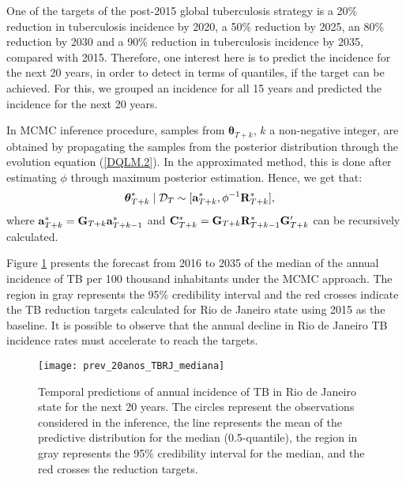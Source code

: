 \documentclass[12pt,a4paper]{article}\usepackage[]{graphicx}\usepackage[]{color}\usepackage{subfigure}
\newcommand{\bftheta}{\boldsymbol{\theta}}
\newcommand{\mathD}{\mathcal{D}}
\begin{document}
One of the targets of the post-2015 global tuberculosis strategy is a 20\% reduction in tuberculosis incidence by 2020, a 50\% reduction by 2025, an 80\% reduction by 2030 and a 90\% reduction in tuberculosis incidence by 2035, compared with 2015. 
Therefore, one interest here is to predict the incidence for the next 20 years, in order to detect in terms of quantiles, if the target can be achieved. 
For this, we grouped an incidence for all 15 years and predicted the incidence for the next 20 years.

In MCMC inference procedure, samples from ${\bftheta}_{T+k}$, $k$ a non-negative integer, are obtained by propagating the samples from the posterior distribution through the evolution equation (\ref{DQLM.2}). In the approximated method, this is done after estimating $\phi$ through maximum posterior estimation.
Hence, we get that:
\begin{align}\label{post_thet_condU_ksteps}
 \bftheta_{T+k}^*\mid \mathD_{T} &\sim [{\bf a}^*_{T+k},\phi^{-1}{\bf R}^*_{T+k}],
  \end{align}
 where $ {\bf a}^*_{T+k}={\bf G}_{T+k}{\bf a}^*_{T+k-1}$ and ${\bf C}_{T+k}^* = {\bf G}_{T+k}{\bf R}^*_{T+k-1}{\bf G}_{T+k}'$ can be recursively calculated.

Figure \ref{applic_TB_prev20} presents the forecast from 2016 to 2035 of the median of the annual incidence of TB per 100 thousand inhabitants under the MCMC approach.
The region in gray represents the 95\% credibility interval and the red crosses indicate the TB reduction targets calculated for Rio de Janeiro state using 2015 as the baseline.
It is possible to observe that the  annual decline in Rio de Janeiro TB incidence rates must accelerate to reach the targets. 



 \begin{figure}[!hbt]
\begin{center}
\texttt{[image: prev\_20anos\_TBRJ\_mediana]} %
\vspace{-0.6 cm}\caption{Temporal predictions of annual incidence of TB in Rio de Janeiro state for the next 20 years. The circles represent the observations considered in the inference, the line 
represents the mean of the predictive distribution for the median (0.5-quantile), the region in gray represents the 95\% credibility interval for the median, and the red crosses the reduction targets.}
\label{applic_TB_prev20}
\end{center}
\end{figure}
\end{document}
